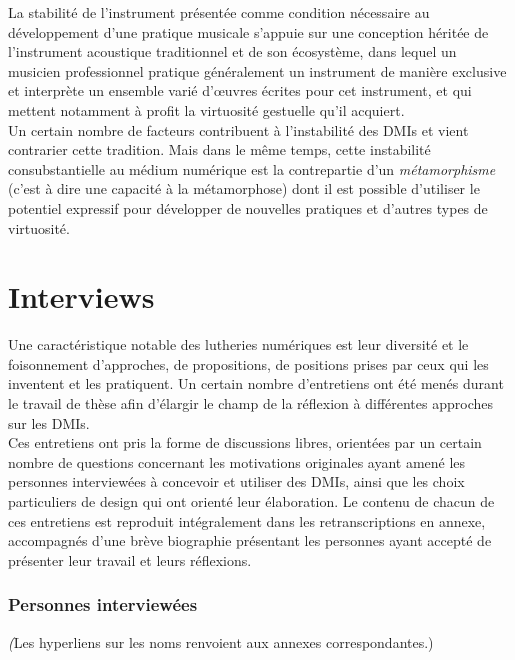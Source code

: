 \noindent La stabilité de l'instrument présentée comme condition nécessaire au développement d'une pratique musicale s'appuie sur une conception héritée de l'instrument acoustique traditionnel et de son écosystème, dans lequel un musicien professionnel pratique généralement un instrument de manière exclusive et interprète un ensemble varié d'œuvres écrites pour cet instrument, et qui mettent notamment à profit la virtuosité gestuelle qu'il acquiert.\\
\indent Un certain nombre de facteurs contribuent à l'instabilité des \glspl{DMI} et vient contrarier cette tradition. Mais dans le même temps, cette instabilité consubstantielle au médium numérique est la contrepartie d'un \textit{métamorphisme} (c'est à dire une capacité à la métamorphose) dont il est possible d'utiliser le potentiel expressif pour développer de nouvelles pratiques et d'autres types de virtuosité.


\section{Interviews}

\noindent Une caractéristique notable des lutheries numériques est leur diversité et le foisonnement d'approches, de propositions, de positions prises par ceux qui les inventent et les pratiquent. Un certain nombre d'entretiens ont été menés durant le travail de thèse afin d'élargir le champ de la réflexion à différentes approches sur les \glspl{DMI}.\\
\indent Ces entretiens ont pris la forme de discussions libres, orientées par un certain nombre de questions concernant les motivations originales ayant amené les personnes interviewées à concevoir et utiliser des \glspl{DMI}, ainsi que les choix particuliers de design qui ont orienté leur élaboration. Le contenu de chacun de ces entretiens est reproduit intégralement dans les retranscriptions en annexe, accompagnés d'une brève biographie présentant les personnes ayant accepté de présenter leur travail et leurs réflexions.

\subsubsection*{Personnes interviewées}
\noindent \textit(Les hyperliens sur les noms renvoient aux annexes correspondantes.)

